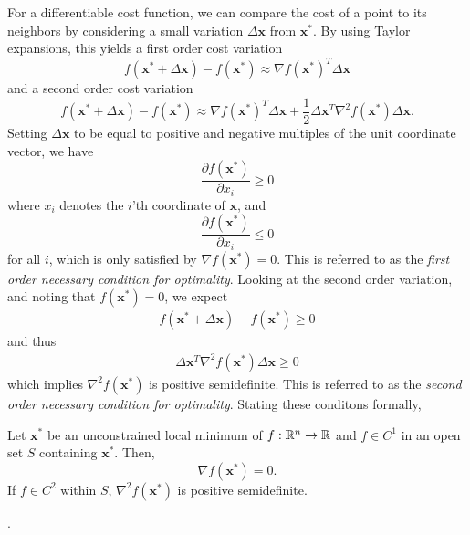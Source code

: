 For a differentiable cost function, we can compare the cost of a point to its neighbors by considering a small variation $\Delta \bm{x}$ from $\bm{x}^*$. By using Taylor expansions, this yields a first order cost variation
\begin{equation}
    f(\bm{x}^* + \Delta \bm{x}) - f(\bm{x}^*) \approx \nabla f(\bm{x}^*)^T \Delta \bm{x}
\end{equation}
and a second order cost variation 
\begin{equation}
    f(\bm{x}^* + \Delta \bm{x}) - f(\bm{x}^*) \approx \nabla f(\bm{x}^*)^T \Delta \bm{x} + \frac{1}{2} \Delta \bm{x}^T \nabla^2 f(\bm{x}^*) \Delta \bm{x}.
\end{equation}
Setting $\Delta \bm{x}$ to be equal to positive and negative multiples of the unit coordinate vector, we have 
\begin{equation}
    \frac{\partial f(\bm{x}^*)}{\partial x_i} \geq 0
\end{equation}
where $x_i$ denotes the $i$'th coordinate of $\bm{x}$, and 
\begin{equation}
    \frac{\partial f(\bm{x}^*)}{\partial x_i} \leq 0
\end{equation}
for all $i$, which is only satisfied by $\nabla f(\bm{x}^*) = 0$.  This is referred to as the \textit{first order necessary condition for optimality}. Looking at the second order variation, and noting that $f(\bm{x}^*) = 0$, we expect
\begin{align}
f(\bm{x}^* + \Delta \bm{x}) - f(\bm{x}^*) \geq 0
\end{align}
and thus
\begin{align}
\Delta \bm{x}^T \nabla^2 f(\bm{x}^*) \Delta \bm{x} \geq 0
\end{align}
which implies $\nabla^2 f(\bm{x}^*)$ is positive semidefinite. This is referred to as the \textit{second order necessary condition for optimality}. Stating these conditons formally, 

\begin{theorem}
Let $\bm{x}^*$ be an unconstrained local minimum of $f:\mathbb{R}^n \to \mathbb{R}$ and $f \in C^1$ in an open set $S$ containing $\bm{x}^*$. Then,
\begin{equation}
    \nabla f(\bm{x}^*) = 0.
\end{equation}
If $f \in C^2$ within $S$, $\nabla^2 f(\bm{x}^*)$ is positive semidefinite. 
\end{theorem}

.

